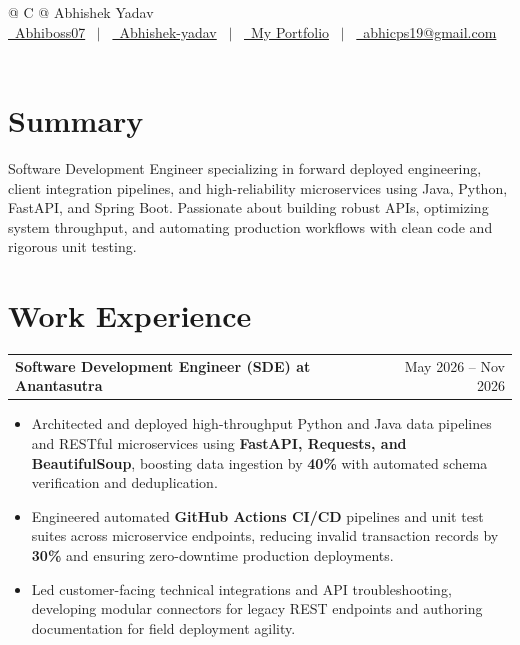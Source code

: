 \documentclass[a4paper,10pt]{article}
\makeatletter
\newenvironment{joblong}[2]
    {
    \begin{tabularx}{\linewidth}{@{}l X r@{}}
    \textbf{#1} & \hfill &  #2 \\[3.50pt]
    \end{tabularx}
    \begin{minipage}[t]{\linewidth}
    \begin{itemize}[nosep,after=\strut, leftmargin=1em, itemsep=3pt,label=--]
    }
    {
    \end{itemize}
    \end{minipage}
    }
\makeatother
\begin{document}
\pagestyle{empty}

\begin{tabularx}{\linewidth}{@{} C @{}}
\Huge{Abhishek Yadav}\\[7.5pt]
\href{https://github.com/Abhiboss07}{\raisebox{-0.05\height}\faGithub\ Abhiboss07} \ $|$ \
\href{https://linkedin.com/in/abhishek-yadav-4738032b7/}{\raisebox{-0.05\height}\faLinkedin\ Abhishek-yadav} \ $|$ \
\href{https://portfolio-abhishek-01.vercel.app}{\raisebox{-0.05\height}\faGlobe \ My Portfolio} \ $|$ \
\href{mailto:abhicps19@gmail.com}{\raisebox{-0.05\height}\faEnvelope \ abhicps19@gmail.com} \ \ \\
\end{tabularx}

\section{Summary}
Software Development Engineer specializing in forward deployed engineering, client integration pipelines, and high-reliability microservices using Java, Python, FastAPI, and Spring Boot. Passionate about building robust APIs, optimizing system throughput, and automating production workflows with clean code and rigorous unit testing.

\section{Work Experience}

\begin{joblong}{Software Development Engineer (SDE) at Anantasutra}{May 2026 -- Nov 2026}
\item Architected and deployed high-throughput Python and Java data pipelines and RESTful microservices using \textbf{FastAPI, Requests, and BeautifulSoup}, boosting data ingestion by \textbf{40\%} with automated schema verification and deduplication.
\item Engineered automated \textbf{GitHub Actions CI/CD} pipelines and unit test suites across microservice endpoints, reducing invalid transaction records by \textbf{30\%} and ensuring zero-downtime production deployments.
\item Led customer-facing technical integrations and API troubleshooting, developing modular connectors for legacy REST endpoints and authoring documentation for field deployment agility.
\end{joblong}
\end{document}
